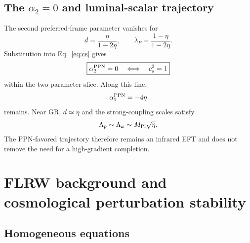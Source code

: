 \documentclass[11pt]{article}
\newcommand{\Mpl}{M_{\rm Pl}}
\newcommand{\cs}{c_s}
\newcommand{\aone}{\alpha_1^{\rm PPN}}
\newcommand{\atwo}{\alpha_2^{\rm PPN}}
\begin{document}
\subsection{The $\alpha_2=0$ and luminal-scalar trajectory}

The second preferred-frame parameter vanishes for
\begin{equation}
\boxed{d=\frac{\eta}{1-2\eta},\qquad
\lambda_P=\frac{1-\eta}{1-2\eta}.}
\label{eq:a2line}
\end{equation}
Substitution into Eq.~\eqref{eq:cs} gives
\begin{equation}
\boxed{\atwo=0\quad\Longleftrightarrow\quad \cs^2=1}
\label{eq:luminalidentity}
\end{equation}
within the two-parameter slice.  Along this line,
\begin{equation}
\aone=-4\eta
\end{equation}
remains.  Near GR, $d\simeq\eta$ and the strong-coupling scales satisfy
\begin{equation}
\Lambda_p\sim\Lambda_\omega\sim\Mpl\sqrt\eta.
\end{equation}
The PPN-favored trajectory therefore remains an infrared EFT and does not remove the need for a high-gradient completion.

\section{FLRW background and cosmological perturbation stability}
\label{sec:FLRW}

\subsection{Homogeneous equations}
\end{document}
